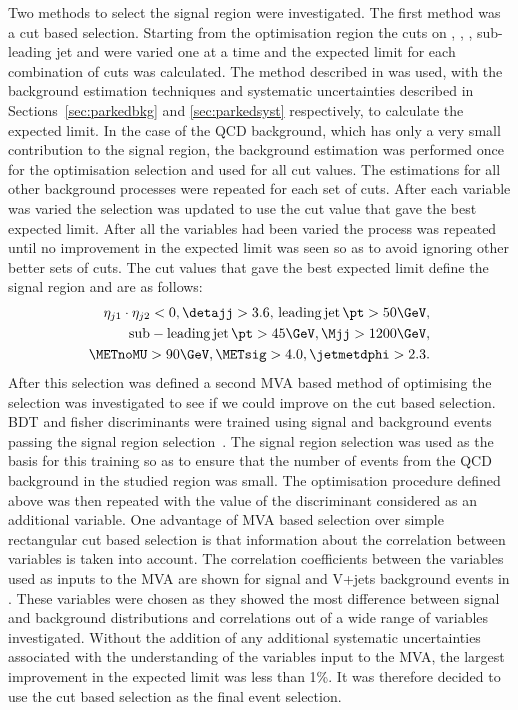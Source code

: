 Two methods to select the signal region were investigated. The first method was a cut based selection. Starting from the optimisation region the cuts on \METsig, \jetmetdphi, \detajj, sub-leading jet \pt and \Mjj were varied one at a time and the expected limit for each combination of cuts was calculated. The method described in  was used, with the background estimation techniques and systematic uncertainties described in Sections~\ref{sec:parkedbkg} and \ref{sec:parkedsyst} respectively, to calculate the expected limit. In the case of the \ac{QCD} background, which has only a very small contribution to the signal region, the background estimation was performed once for the optimisation selection and used for all cut values. The estimations for all other background processes were repeated for each set of cuts. After each variable was varied the selection was updated to use the cut value that gave the best expected limit. After all the variables had been varied the process was repeated until no improvement in the expected limit was seen so as to avoid ignoring other better sets of cuts. The cut values that gave the best expected limit define the signal region and are as follows:
\begin{equation}
  \label{eq:parkedsigsel}
  \begin{split}
    \eta_{j1}\cdot\eta_{j2}<0,\detajj>3.6,\,\mathrm{leading\,jet\,\pt}>50 \GeV,\\
    \mathrm{sub-leading\,jet\,\pt}>45 \GeV, \Mjj>1200 \GeV,\\
    \METnoMU>90 \GeV, \METsig>4.0,\jetmetdphi>2.3.
  \end{split}
\end{equation}
After this selection was defined a second \ac{MVA} based method of optimising the selection was investigated to see if we could improve on the cut based selection. \ac{BDT} and fisher discriminants were trained using signal and background events passing the signal region selection~\cite{TMVA}. The signal region selection was used as the basis for this training so as to ensure that the number of events from the \ac{QCD} background in the studied region was small. The optimisation procedure defined above was then repeated with the value of the discriminant considered as an additional variable. One advantage of \ac{MVA} based selection over simple rectangular cut based selection is that information about the correlation between variables is taken into account. The correlation coefficients between the variables used as inputs to the \ac{MVA} are shown for signal and V+jets background events in . These variables were chosen as they showed the most difference between signal and background distributions and correlations out of a wide range of variables investigated. Without the addition of any additional systematic uncertainties associated with the understanding of the variables input to the \ac{MVA}, the largest improvement in the expected limit was less than 1\%. It was therefore decided to use the cut based selection as the final event selection.
